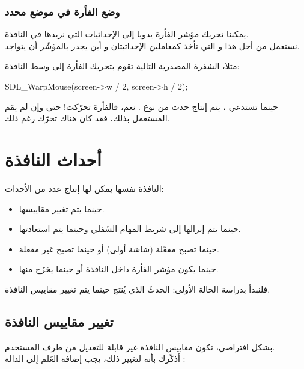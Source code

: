 \subsubsection{وضع الفأرة في موضع محدد}

يمكننا تحريك مؤشر الفأرة يدويا إلى الإحداثيات التي نريدها في النافذة.\\
نستعمل من أجل هذا
و التي تأخذ كمعاملين الإحداثيتان
و 
أين يجدر بالمؤشّر أن يتواجد.

مثلا، الشفرة المصدرية التالية تقوم بتحريك الفأرة إلى وسط النافذة:

\begin{Csource}
SDL_WarpMouse(screen->w / 2, screen->h / 2);
\end{Csource}

\begin{information}
حينما تستدعي
،
يتم إنتاج حدث من نوع
.
نعم، فالفأرة تحرّكت! حتى وإن لم يقم المستعمل بذلك، فقد كان هناك تحرّك رغم ذلك.
\end{information}

\section{أحداث النافذة}

النافذة نفسها يمكن لها إنتاج عدد من الأحداث:

\begin{itemize}
	\item حينما يتم تغيير مقاييسها.
	\item حينما يتم إنزالها إلى شريط المهام السُفلي وحينما يتم استعادتها.
	\item حينما تصبح مفعّلة (شاشة أولى) أو حينما تصبح غير مفعلة.
	\item حينما يكون مؤشر الفأرة داخل النافذة أو حينما يخرُج منها.
\end{itemize}

فلنبدأ بدراسة الحالة الأولى: الحدثُ الذي يُنتج حينما يتم تغيير مقاييس النافذة.

\subsection{تغيير مقاييس النافذة}

بشكل افتراضي، تكون مقاييس النافذة غير قابلة للتعديل من طرف المستخدم.\\
أذكّرك بأنه لتغيير ذلك، يجب إضافة العَلم
إلى الدالة
:

